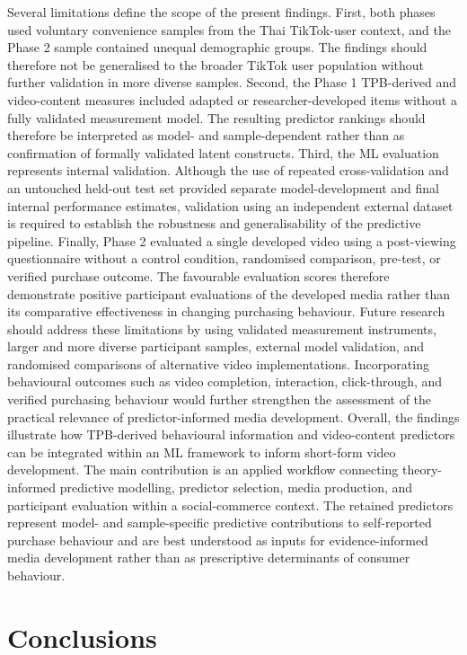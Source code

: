 \documentclass[jtaer,article,submit,moreauthors]{Definitions/mdpi}
\begin{document}
Several limitations define the scope of the present findings. First,
both phases used voluntary convenience samples from the Thai TikTok-user
context, and the Phase 2 sample contained unequal demographic groups.
The findings should therefore not be generalised to the broader TikTok
user population without further validation in more diverse samples.
Second, the Phase 1 TPB-derived and video-content measures included
adapted or researcher-developed items without a fully validated
measurement model. The resulting predictor rankings should therefore be
interpreted as model- and sample-dependent rather than as confirmation
of formally validated latent constructs.
Third, the ML evaluation represents internal validation. Although the
use of repeated cross-validation and an untouched held-out test set
provided separate model-development and final internal performance
estimates, validation using an independent external dataset is required
to establish the robustness and generalisability of the predictive
pipeline.
Finally, Phase 2 evaluated a single developed video using a
post-viewing questionnaire without a control condition, randomised
comparison, pre-test, or verified purchase outcome. The favourable
evaluation scores therefore demonstrate positive participant
evaluations of the developed media rather than its comparative
effectiveness in changing purchasing behaviour.
Future research should address these limitations by using validated
measurement instruments, larger and more diverse participant samples,
external model validation, and randomised comparisons of alternative
video implementations. Incorporating behavioural outcomes such as
video completion, interaction, click-through, and verified purchasing
behaviour would further strengthen the assessment of the practical
relevance of predictor-informed media development.
Overall, the findings illustrate how TPB-derived behavioural
information and video-content predictors can be integrated within an ML
framework to inform short-form video development. The main contribution
is an applied workflow connecting theory-informed predictive modelling,
predictor selection, media production, and participant evaluation within
a social-commerce context. The retained predictors represent
model- and sample-specific predictive contributions to self-reported
purchase behaviour and are best understood as inputs for
evidence-informed media development rather than as prescriptive
determinants of consumer behaviour.

\section{Conclusions}
\end{document}
